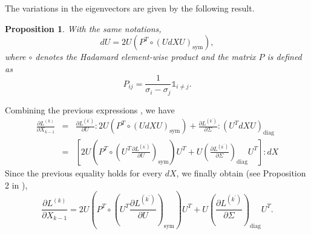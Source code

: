 \documentclass[10pt,a4paper]{book}
\theoremstyle{definition}
\theoremstyle{plain}
\newtheorem{prop}{Proposition}[section]
\theoremstyle{remark}
\begin{document}
The variations in the eigenvectors are given by the following result.
\begin{prop}
    With the same notations,
    $$dU=2U(P^T \circ (U dX U)_{\text{sym}}),$$
    where $\circ$ denotes the Hadamard element-wise product and the matrix $P$ is defined as
    $$P_{ij}=\frac{1}{\sigma_i-\sigma_j}\mathds{1}_{i\neq j}.$$
    \end{prop}
    
Combining the previous expressions , we have
\begin{eqnarray*}
    \frac{\partial{L^{(k)}}}{\partial X_{k-1}}&=&\frac{\partial L^{(k^{\prime})}}{\partial U}:2U(P^T \circ (U dX U)_{\text{sym}})+\frac{\partial L^{(k^{\prime})}}{\partial \Sigma}:(U^T dX U)_{\text{diag}}\\
    &=&\left [2U\left(P^T \circ \left(U^T \frac{\partial L^{(k^{\prime})}}{\partial U}\right)_{\text{sym}}\right)U^T+U\left (\frac{\partial L^{(k^{\prime})}}{\partial \Sigma} \right )_{\text{diag}} U^T\right ]: dX
\end{eqnarray*}
Since the previous equality holds for every $dX$, we finally obtain (see Proposition 2 in \cite{ionescu2016trainingdeepnetworksstructured}),
$$\frac{\partial L^{(k)}}{\partial X_{k-1}}=2U(P^T \circ (U^T \frac{\partial L^{(k^{\prime})}}{\partial U})_{\text{sym}})U^T+U\left (\frac{\partial L^{(k^{\prime})}}{\partial \Sigma} \right )_{\text{diag}}U^T.$$
\end{document}
